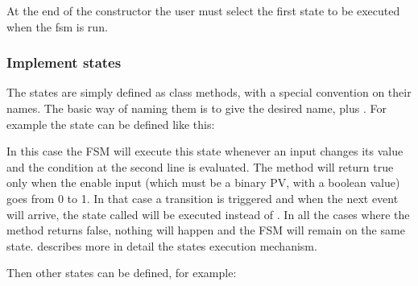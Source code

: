 \documentclass[letterpaper,10pt,english]{sphinxmanual}
\begin{document}
At the end of the constructor the user must select the first state to
be executed when the fsm is run.

%
\begin{sphinxVerbatim}[commandchars=\\\{\}]
\end{sphinxVerbatim}


\subsubsection{Implement states}
\label{\detokenize{overview:implement-states}}
The states are simply defined as class methods, with a special
convention on their names. The basic way of naming them is to give the
desired name, plus . For example the  state can be
defined like this:

%
\begin{sphinxVerbatim}[commandchars=\\\{\}]
 
       
\end{sphinxVerbatim}

In this case the FSM will execute this state whenever an input changes
its value and the condition at the second line is evaluated. The
 method will return true only when the enable input (which
must be a binary PV, with a boolean value) goes from 0 to 1. In that
case a transition is triggered and when the next event will arrive,
the state called  will be executed instead of .
In all the cases where the  method returns false, nothing
will happen and the FSM will remain on the same state.
{\hyperref[\detokenize{fsm:fsm-development}]{}} describes more in detail the states execution mechanism.

Then other states can be defined, for example:
\end{document}
